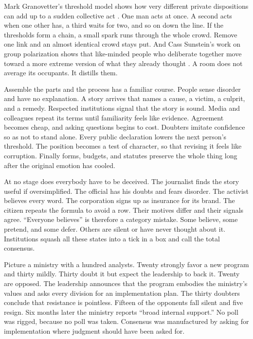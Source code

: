 \documentclass[12pt,a4paper]{book}
\begin{document}
Mark Granovetter's threshold model shows how very different private dispositions can add up to a sudden collective act \cite{Granovetter1978}. One man acts at once. A second acts when one other has, a third waits for two, and so on down the line. If the thresholds form a chain, a small spark runs through the whole crowd. Remove one link and an almost identical crowd stays put. And Cass Sunstein's work on group polarization shows that like-minded people who deliberate together move toward a more extreme version of what they already thought \cite{Sunstein2002}. A room does not average its occupants. It distills them.

Assemble the parts and the process has a familiar course. People sense disorder and have no explanation. A story arrives that names a cause, a victim, a culprit, and a remedy. Respected institutions signal that the story is sound. Media and colleagues repeat its terms until familiarity feels like evidence. Agreement becomes cheap, and asking questions begins to cost. Doubters imitate confidence so as not to stand alone. Every public declaration lowers the next person's threshold. The position becomes a test of character, so that revising it feels like corruption. Finally forms, budgets, and statutes preserve the whole thing long after the original emotion has cooled.

At no stage does everybody have to be deceived. The journalist finds the story useful if oversimplified. The official has his doubts and fears disorder. The activist believes every word. The corporation signs up as insurance for its brand. The citizen repeats the formula to avoid a row. Their motives differ and their signals agree. ``Everyone believes'' is therefore a category mistake. Some believe, some pretend, and some defer. Others are silent or have never thought about it. Institutions squash all these states into a tick in a box and call the total consensus.

Picture a ministry with a hundred analysts. Twenty strongly favor a new program and thirty mildly. Thirty doubt it but expect the leadership to back it. Twenty are opposed. The leadership announces that the program embodies the ministry's values and asks every division for an implementation plan. The thirty doubters conclude that resistance is pointless. Fifteen of the opponents fall silent and five resign. Six months later the ministry reports ``broad internal support.'' No poll was rigged, because no poll was taken. Consensus was manufactured by asking for implementation where judgment should have been asked for.
\end{document}

